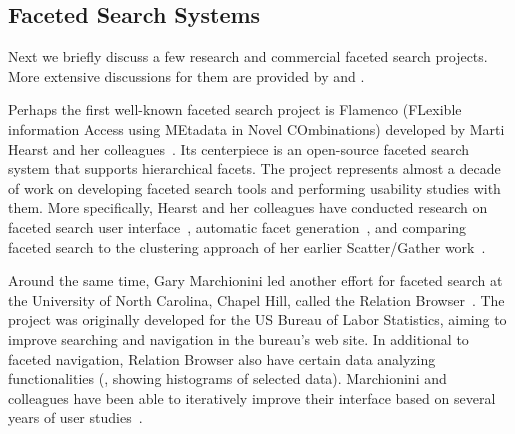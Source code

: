 
\subsection{Faceted Search Systems}
Next we briefly discuss a few research and commercial faceted search projects. More extensive discussions for them are provided by \citet{tunkelang2009faceted} and \citet{wei2013survey}.

Perhaps the first well-known faceted search project is Flamenco (FLexible information Access using MEtadata in Novel COmbinations) developed by Marti Hearst and her colleagues~\cite{hearst2000next}. Its centerpiece is an open-source faceted search system that supports hierarchical facets. The project represents almost a decade of work on developing faceted search tools and performing usability studies with them. More specifically, Hearst and her colleagues have conducted research on faceted search user interface~\cite{hearst2006design}, automatic facet generation~\cite{stoica2007automating}, and comparing faceted search to the clustering approach of her earlier Scatter/Gather work~\cite{hearst2006clustering}.

Around the same time, Gary Marchionini led another effort for faceted search at the University of North Carolina, Chapel Hill, called the Relation Browser~\cite{zhang2005evaluation,capra2008relation}. The project was originally developed for the US Bureau of Labor Statistics, aiming to improve searching and navigation in the bureau's web site. In additional to faceted navigation, Relation Browser also have certain data analyzing functionalities (\eg, showing histograms of selected data). Marchionini and colleagues have been able to iteratively improve their interface based on several years of user studies~\cite{marchionini2003towards,zhang2004relational}.

